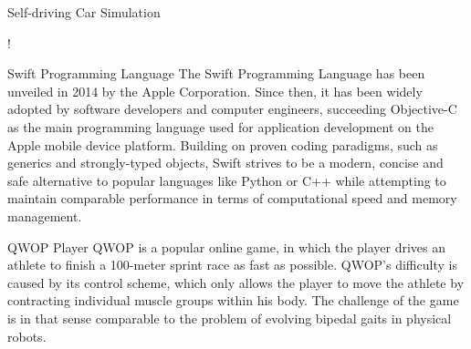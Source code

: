 \documentclass[a0paper,portrait]{baposter}
\begin{document}
\begin{poster}
\begin{posterbox}[name=car,column=1,below=arch]{Self-driving Car Simulation}
	\begin{center}
		\resizebox {\columnwidth} {!} {
		}
	\end{center}
\end{posterbox}

\begin{posterbox}[name=intro-swift,column=0,below=intro-ga,bottomaligned=car]{Swift Programming Language}
	The Swift Programming Language has been unveiled in 2014 by the Apple Corporation. Since then, it has been widely adopted by software developers and computer engineers, succeeding Objective-C as the main programming language used for application development on the Apple mobile device platform. Building on proven coding paradigms, such as generics and strongly-typed objects, Swift strives to be a modern, concise and safe alternative to popular languages like Python or C++ while attempting to maintain comparable performance in terms of computational speed and memory management.
\end{posterbox}

\begin{posterbox}[name=qwop,column=2]{QWOP Player}
	QWOP \cite{QwopWebsite} is a popular online game, in which the player drives an athlete to finish a 100-meter sprint race as fast as possible. QWOP's difficulty is caused by its control scheme, which only allows the player to move the athlete by contracting individual muscle groups within his body. The challenge of the game is in that sense comparable to the problem of evolving bipedal gaits in physical robots.

	\vspace{0.5em}


\end{posterbox}
\end{poster}
\end{document}
